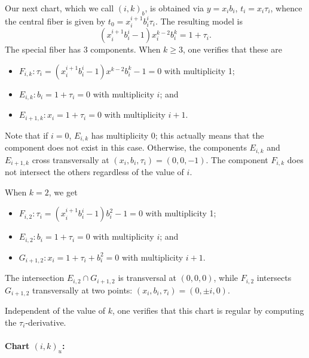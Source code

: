 \documentclass[pagesize,paper=letter]{scrartcl}
\theoremstyle{plain}
\theoremstyle{definition}
\theoremstyle{remark}
\begin{document}
Our next chart, which we call $(i,k)_b$, is obtained via $y = x_ib_i$, $t_i = x_i\tau_i$, whence the central fiber is given by $t_0 = x_i^{i+1}b_i^i\tau_i$. The resulting model is
\[
(x_i^{i+1}b_i^i - 1)x_i^{k-2} b_i^k = 1 + \tau_i.
\]
The special fiber has 3 components. When $k \geq 3$, one verifies that these are
\begin{itemize}
    \item $F_{i,k}: \tau_i = (x_i^{i+1}b_i^i - 1)x^{k-2} b_i^k - 1 = 0$ with multiplicity 1;
    \item $E_{i,k}: b_i = 1+\tau_i = 0$ with multiplicity $i$; and
    \item $E_{i+1,k}: x_i = 1+\tau_i = 0$ with multiplicity $i+1$.
\end{itemize}
Note that if $i = 0$, $E_{i,k}$ has multiplicity $0$; this actually means that the component does not exist in this case. Otherwise,
the components $E_{i,k}$ and $E_{i+1,k}$ cross transversally at $(x_i, b_i, \tau_i) = (0, 0, -1)$. The component $F_{i,k}$ does not intersect the others regardless of the value of $i$.

When $k = 2$, we get
\begin{itemize}
    \item $F_{i,2}: \tau_i = (x_i^{i+1}b_i^i - 1) b_i^2 - 1 = 0$ with multiplicity 1;
    \item $E_{i,2}: b_i = 1+\tau_i = 0$ with multiplicity $i$; and
    \item $G_{i+1,2}: x_i = 1+\tau_i+b_i^2 = 0$ with multiplicity $i+1$.
\end{itemize}
The intersection $E_{i,2} \cap G_{i+1,2}$ is transversal at $(0,0,0)$, while $F_{i,2}$ intersects $G_{i+1,2}$ transversally at two points: $(x_i, b_i, \tau_i) = (0, \pm i, 0)$.

Independent of the value of $k$, one verifies that this chart is regular by computing the $\tau_i$-derivative.

\paragraph{Chart $(i,k)_u$:}
\label{sec:chart-i-k_u}
\end{document}

